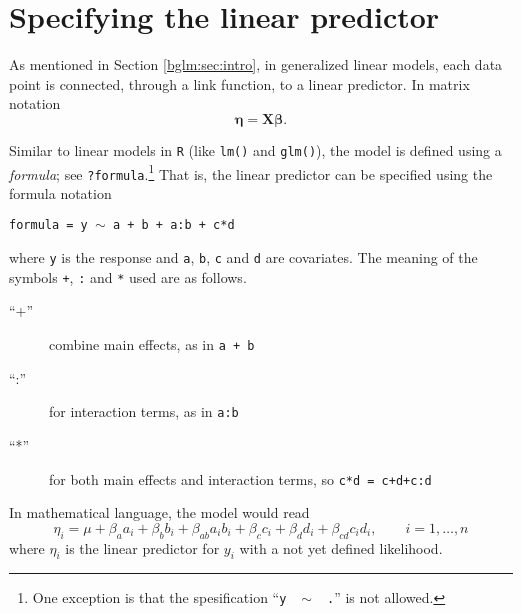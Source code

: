 \documentclass[a4paper,11pt]{report}
\newcommand{\tv}{\texttt}
\def\bs#1{\ensuremath{\boldsymbol{#1}}} %
\begin{document}
\section{Specifying the linear predictor}

As mentioned in Section \ref{bglm:sec:intro}, in generalized linear
models, each data point is connected, through a link function, to a
linear predictor. In matrix notation
\begin{equation}
    \bs{\eta} = \bs{X}\bs{\beta}.
    \label{bglm:eq:linear_pred}
\end{equation}

Similar to linear models in \tv{R} (like \tv{lm()} and \tv{glm()}),
the model is defined using a \emph{formula}; see
\verb|?formula|.\footnote{One exception is that the spesification
    ``\texttt{y $\;\mbox{$\sim$}\;$ .}'' is not allowed.}
That
    is, the linear predictor can be specified using the formula
    notation
\begin{center}
    \texttt{formula = y \;\mbox{$\sim$}\; a + b + a:b + c*d}
\end{center}
where \texttt{y} is the response and \texttt{a}, \texttt{b},
\texttt{c} and \texttt{d} are covariates.  The meaning of the symbols
\texttt{+}, \texttt{:} and \texttt{*} used  are as follows.
\begin{description}
\item[``+''] combine main effects, as in \tv{a + b}
\item[``:''] for interaction terms, as in \tv{a:b}
\item[``*''] for both main effects and interaction terms, so \tv{c*d = c+d+c:d}
\end{description}
In mathematical language, the model would read
\begin{displaymath}
    \eta_{i} = \mu 
    + \beta_{a}a_{i}
    + \beta_{b}b_{i}
    + \beta_{ab}a_{i}b_{i}
    + \beta_{c}c_{i}
    + \beta_{d}d_{i}
    + \beta_{cd}c_{i}d_{i}, \qquad i=1, \ldots, n
\end{displaymath}
where $\eta_{i}$ is the linear predictor for $y_{i}$ with a not yet
defined likelihood.
\end{document}
